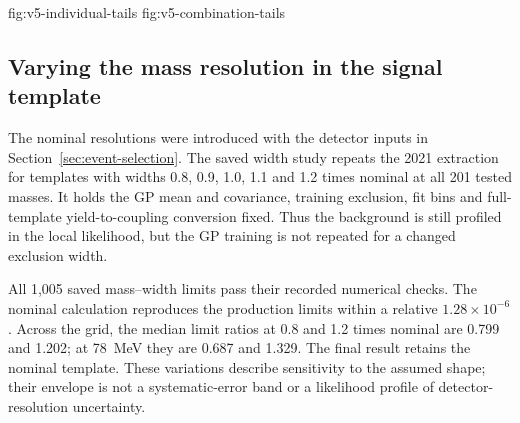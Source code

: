 {fig:v5-individual-tails}
{fig:v5-combination-tails}
\FloatBarrier

\subsection{Varying the mass resolution in the signal template}
\label{sec:v5-resolution-results}

The nominal resolutions were introduced with the detector inputs in
Section~\ref{sec:event-selection}. The saved width study repeats the 2021
extraction for templates with widths 0.8, 0.9, 1.0, 1.1 and 1.2 times nominal
at all 201 tested masses. It holds the GP mean and covariance, training
exclusion, fit bins and full-template yield-to-coupling conversion fixed.
Thus the background is still profiled in the local likelihood, but the GP
training is not repeated for a changed exclusion width.

All 1,005 saved mass--width limits pass their recorded numerical checks. The
nominal calculation reproduces the production limits within a relative
$1.28\times10^{-6}$. Across the grid, the median limit ratios at 0.8 and 1.2
times nominal are 0.799 and 1.202; at 78~MeV they are 0.687 and 1.329.
The final result retains the nominal template. These variations describe
sensitivity to the assumed shape; their envelope is not a systematic-error
band or a likelihood profile of detector-resolution uncertainty.

